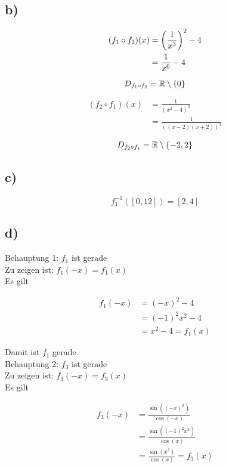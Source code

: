 \documentclass[a4paper, 11pt]{article}
\begin{document}
\subsection{b)}
\label{sec:org733bf64}
\begin{align*}
    (f_1 \circ f_2)(x) &= \left(\frac{1}{x^3}\right)^2 - 4 \\
    &= \frac{1}{x^6} - 4
\end{align*}

$$ D_{f_1 \circ f_2} = \mathbb{R} \setminus \{0\} $$

\begin{align*}
    (f_2 \circ f_1)(x) &= \frac{1}{(x^2 - 4)^3} \\
    &= \frac{1}{((x - 2)(x + 2))^3}
\end{align*}

$$ D_{f_2 \circ f_1} = \mathbb{R} \setminus \{-2, 2\} $$

\subsection{c)}
\label{sec:org2acd02a}
$$ f_{1}^{-1}([0, 12]) = [2, 4] $$

\subsection{d)}
\label{sec:org1e45f01}
Behauptung 1: \(f_1\) ist gerade \\

Zu zeigen ist: \(f_1(-x) = f_1(x)\) \\
Es gilt

\begin{align*}
    f_1(-x) &= (-x)^2 - 4 \\
    &= (-1)^2 x^2 - 4 \\
    &= x^2 - 4 = f_1(x)
\end{align*}

Damit ist \(f_1\) gerade. \\


Behauptung 2: \(f_3\) ist gerade \\

Zu zeigen ist: \(f_3(-x) = f_3(x)\) \\
Es gilt

\begin{align*}
    f_3(-x) &= \frac{\sin((-x)^2)}{\cos(-x)} \\
    &= \frac{\sin((-1)^2 x^2)}{\cos(x)} \\
    &= \frac{\sin(x^2)}{\cos(x)} = f_3(x) \\
\end{align*}
\end{document}
